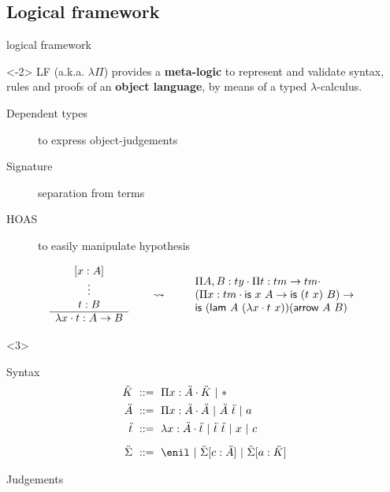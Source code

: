 \documentclass[ignorenonframetext,red]{beamer}
\begin{document}
\subsection{Logical framework}

\begin{frame}{ logical framework }
  \begin{onlyenv}<-2>
    LF  (a.k.a. $\lambda\Pi$) provides a {\bf
      meta-logic} to represent and validate syntax, rules and proofs
    of an \textbf{object language}, by means of a typed
    $\lambda$-calculus.

    \begin{description}
    \item[Dependent types] to express object-judgements
    \item[Signature] separation from terms
    \item[HOAS] to easily manipulate hypothesis
    \end{description}
    \pause
    \begin{example}
      \scriptsize
      \[
      \begin{array}{c}
        [x:A]\\
        \vdots\\
        t : B \\\hline
        \lambda{x}\cdot t : A\to B
      \end{array}
      \qquad\leadsto\qquad
      \begin{array}{l}
        \Pi{A,B}:{ty}\cdot \Pi{t}:{tm\to tm}\cdot \\
        (\Pi{x}:{tm}\cdot {\textsf{is}\ x\ A} \to \textsf{is}\ (t\ x)\ B) \to \\
        \textsf{is}\ (\textsf{lam}\ A\ (\lambda{x}\cdot t\ x))(\textsf{arrow}\ A\ B)
      \end{array}
      \]
    \end{example}
  \end{onlyenv}
  \begin{onlyenv}<3>
    \begin{block}{Syntax}
      \inXLF
      \begin{align*}
        \mk &\gequal { \prd\mv\mf\mk \gor \type } \\
        \mf &\gequal { \prd\mv\mf\mf \gor \app\mf\mo \gor \mcf } \\
        \mo &\gequal { \lam\mv\mf\mo \gor \app\mo\mo \gor \mv \gor \mco } \\[0.5em]
        \msi &\gequal { \enil \gor \ebinddecl\msi\mco\mf \gor
          \ebinddecl\msi\mcf\mk }
      \end{align*}
    \end{block}
    \begin{block}{Judgements}
      

\end{block}
\end{onlyenv}
\end{frame}
\end{document}
